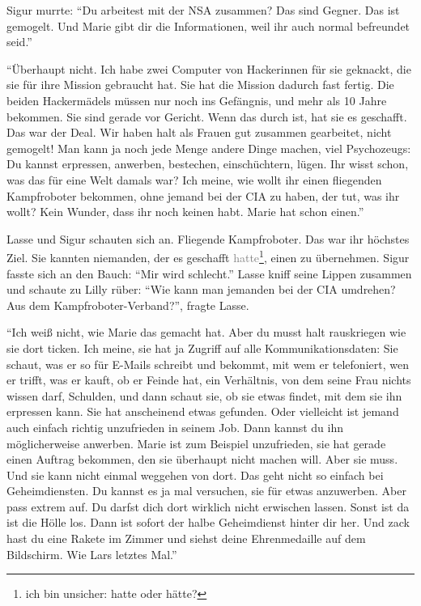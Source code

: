 Sigur murrte: \enquote{Du arbeitest mit der NSA zusammen? Das sind Gegner.
Das ist gemogelt.
Und Marie gibt dir die Informationen, weil ihr auch normal befreundet seid.}

\enquote{Überhaupt nicht.
Ich habe zwei Computer von Hackerinnen für sie geknackt, die sie für ihre Mission gebraucht hat.
Sie hat die Mission dadurch fast fertig.
Die beiden Hackermädels müssen nur noch ins Gefängnis, und mehr als 10 Jahre bekommen.
Sie sind gerade vor Gericht.
Wenn das durch ist, hat sie es geschafft.
Das war der Deal.
Wir haben halt als Frauen gut zusammen gearbeitet, nicht gemogelt! Man kann ja noch jede Menge andere Dinge machen, viel Psychozeugs: Du kannst erpressen, anwerben, bestechen, einschüchtern, lügen.
Ihr wisst schon, was das für eine Welt damals war? Ich meine, wie wollt ihr einen fliegenden Kampfroboter bekommen, ohne jemand bei der CIA zu haben, der tut, was ihr wollt? Kein Wunder, dass ihr noch keinen habt.
Marie hat schon einen.}

Lasse und Sigur schauten sich an.
Fliegende Kampfroboter.
Das war ihr höchstes Ziel.
Sie kannten niemanden, der es geschafft \textcolor{gray}{hatte}\footnote{ich bin unsicher: hatte oder hätte?}, einen zu übernehmen.
Sigur fasste sich an den Bauch: \enquote{Mir wird schlecht.} Lasse kniff seine Lippen zusammen und schaute zu Lilly rüber: \enquote{Wie kann man jemanden bei der CIA umdrehen? Aus dem Kampfroboter-Verband?}, fragte Lasse.

\enquote{Ich weiß nicht, wie Marie das gemacht hat.
Aber du musst halt rauskriegen wie sie dort ticken.
Ich meine, sie hat ja Zugriff auf alle Kommunikationsdaten: Sie schaut, was er so für E-Mails schreibt und bekommt, mit wem er telefoniert, wen er trifft, was er kauft, ob er Feinde hat, ein Verhältnis, von dem seine Frau nichts wissen darf, Schulden, und dann schaut sie, ob sie etwas findet, mit dem sie ihn erpressen kann.
Sie hat anscheinend etwas gefunden.
Oder vielleicht ist jemand auch einfach richtig unzufrieden in seinem Job.
Dann kannst du ihn möglicherweise anwerben.
Marie ist zum Beispiel unzufrieden, sie hat gerade einen Auftrag bekommen, den sie überhaupt nicht machen will.
Aber sie muss.
Und sie kann nicht einmal weggehen von dort.
Das geht nicht so einfach bei Geheimdiensten.
Du kannst es ja mal versuchen, sie für etwas anzuwerben.
Aber pass extrem auf.
Du darfst dich dort wirklich nicht erwischen lassen.
Sonst ist da ist die Hölle los.
Dann ist sofort der halbe Geheimdienst hinter dir her.
Und zack hast du eine Rakete im Zimmer und siehst deine Ehrenmedaille auf dem Bildschirm.
Wie Lars letztes Mal.}

